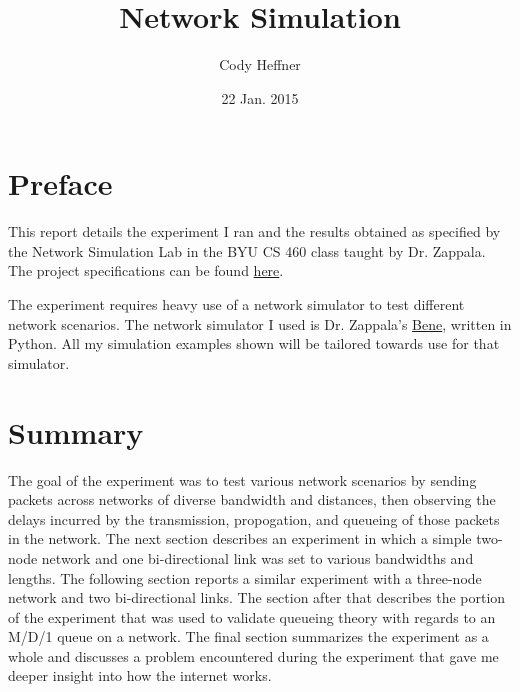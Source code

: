 \documentclass[11pt]{article}
\begin{document}
\lstset{
  language=Python,
  basicstyle=\small,          %
  keywordstyle=\bfseries,
  identifierstyle=,           %
  commentstyle=,              %
  stringstyle=\ttfamily,      %
  showstringspaces=false,     %
  numbers=left,
  numberstyle=\tiny,
  numbersep=5pt,
  frame=tb,
}

\newenvironment{absolutelynopagebreak}
  {\par\nobreak\vfil\penalty0\vfilneg
   \vtop\bgroup}
  {\par\xdef\tpd{\the\prevdepth}\egroup
   \prevdepth=\tpd}

\title{Network Simulation}

\author{Cody Heffner}

\date{22 Jan. 2015}

\maketitle

\section{Preface}

This report details the experiment I ran and the results obtained as specified by the Network Simulation Lab in the BYU CS 460 class taught by Dr. Zappala. The project specifications can be found \href{http://cs460.byu.edu/winter-2015/labs/network-simulation}{here}.

The experiment requires heavy use of a network simulator to test different network scenarios. The network simulator I used is Dr. Zappala's \href{https://github.com/zappala/bene}{Bene}, written in Python. All my simulation examples shown will be tailored towards use for that simulator.

\section{Summary}

The goal of the experiment was to test various network scenarios by sending packets across networks of diverse bandwidth and distances, then observing the delays incurred by the transmission, propogation, and queueing of those packets in the network. The next section describes an experiment in which a simple two-node network and one bi-directional link was set to various bandwidths and lengths. The following section reports a similar experiment with a three-node network and two bi-directional links. The section after that describes the portion of the experiment that was used to validate queueing theory with regards to an M/D/1 queue on a network. The final section summarizes the experiment as a whole and discusses a problem encountered during the experiment that gave me deeper insight into how the internet works.
\end{document}

